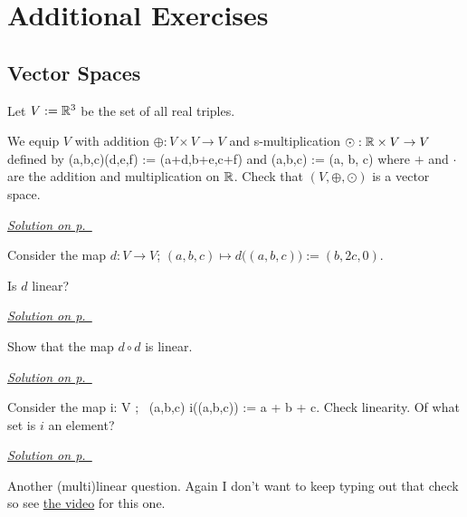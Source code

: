 \section{Additional Exercises}

\subsection{Vector Spaces}

\begin{exercise}\label{ex:multilinear-1}
Let $V:=\mathbb{R}^3$ be the set of all real triples.

We equip $V$ with addition $\oplus : V \times V\to V$ and s-multiplication $\odot:\mathbb{R}\times V \to V$ defined by
\bse
    (a,b,c)\oplus(d,e,f) := (a+d,b+e,c+f)
\ese
and
\bse
    \lambda \odot (a,b,c) := (\lambda \cdot a, \lambda \cdot b, \lambda \cdot c)
\ese
where $+$ and $\cdot$ are the addition and multiplication on $\mathbb{R}$. Check that $(V,\oplus,\odot)$ is a vector space.
\end{exercise}
\hyperref[sol:multilinear-1]{\small \textit{Solution on p.~\pageref*{sol:multilinear-1}}}

\begin{exercise}\label{ex:multilinear-2}
Consider the map $d:V\to V$; $(a,b,c)\mapsto d\big((a,b,c)\big) := (b,2c,0)$.

Is $d$ linear?
\end{exercise}
\hyperref[sol:multilinear-2]{\small \textit{Solution on p.~\pageref*{sol:multilinear-2}}}

\begin{exercise}\label{ex:multilinear-3}
Show that the map $d\circ d$ is linear.
\end{exercise}
\hyperref[sol:multilinear-3]{\small \textit{Solution on p.~\pageref*{sol:multilinear-3}}}

\begin{exercise}\label{ex:multilinear-4}
Consider the map
\bse
    i: V \to \R; \, (a,b,c) \mapsto i\big((a,b,c)\big) := a + b + c.
\ese
Check linearity. Of what set is $i$ an element?
\end{exercise}
\hyperref[sol:multilinear-4]{\small \textit{Solution on p.~\pageref*{sol:multilinear-4}}}

\begin{exercise}\label{ex:multilinear-5}
Another (multi)linear question. Again I don't want to keep typing out that check so see \href{https://www.youtube.com/watch?v=5oeWX3NUhMA&list=PLFeEvEPtX_0RQ1ys-7VIsKlBWz7RX-FaL&index=3}{the video} for this one.
\end{exercise}

